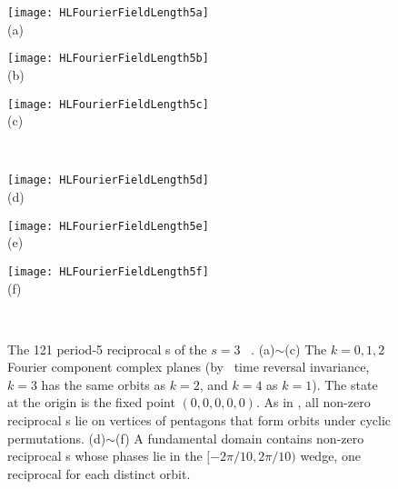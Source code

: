 \begin{figure}
  \centering
            \begin{minipage}[c]{0.25\textwidth}\begin{center}
\texttt{[image: HLFourierFieldLength5a]}\\(a)
            \end{center}\end{minipage}
            \begin{minipage}[c]{0.25\textwidth}\begin{center}
\texttt{[image: HLFourierFieldLength5b]}\\(b)
            \end{center}\end{minipage}
            \begin{minipage}[c]{0.25\textwidth}\begin{center}
\texttt{[image: HLFourierFieldLength5c]}\\(c)
            \end{center}\end{minipage}
~~~
\\
            \begin{minipage}[c]{0.25\textwidth}\begin{center}
\texttt{[image: HLFourierFieldLength5d]}\\(d)
            \end{center}\end{minipage}
            \begin{minipage}[c]{0.25\textwidth}\begin{center}
\texttt{[image: HLFourierFieldLength5e]}\\(e)
            \end{center}\end{minipage}
            \begin{minipage}[c]{0.25\textwidth}\begin{center}
\texttt{[image: HLFourierFieldLength5f]}\\(f)
            \end{center}\end{minipage}
\\ %
  \caption{\label{fig:templattC5} %
The 121 period-5 reciprocal {\lattstate}s
of the $s=3$ \templatt\ .
    (a)$\sim$(c)
The $k=0,1,2$ Fourier component complex planes (by \templatt\ time
reversal invariance, $k=3$ has the same orbits as $k=2$, and  $k=4$ as
$k=1$).
The state at the origin is the fixed point $(0,0,0,0,0)$.
As in , all non-zero reciprocal {\lattstate}s
lie on vertices of pentagons that form orbits under  cyclic permutations.
    (d)$\sim$(f)
A  fundamental domain contains non-zero  reciprocal
{\lattstate}s whose phases lie in the $[-2\pi/10,2\pi/10)$ wedge, one reciprocal
{\lattstate} for each distinct  orbit.
          }
\end{figure}

